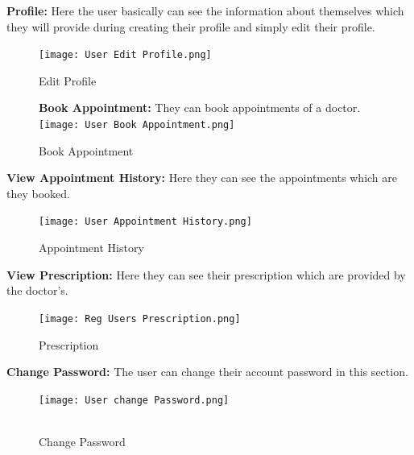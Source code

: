 \documentclass[14pt,a4paper,calibribody]{article}
\begin{document}
\textbf{Profile:} Here the user basically can see the information about themselves which they will provide during creating their profile and simply edit their profile.
\begin{figure}[h]
\texttt{[image: User Edit Profile.png]}
\caption{Edit Profile}
\end{figure}
\clearpage
\begin{figure}[h]
\textbf{Book Appointment:} They can book appointments of a doctor. \\
\texttt{[image: User Book Appointment.png]}\\
\caption{Book Appointment}
\end{figure}

\textbf{View Appointment History:} Here they can see the appointments which are they booked.\\
\begin{figure}[h]
\texttt{[image: User Appointment History.png]}\\
\caption{Appointment History}
\end{figure}
\clearpage
\textbf{View Prescription:} Here they can see their prescription which are provided by the doctor's.\\
\begin{figure}[h]
\texttt{[image: Reg Users Prescription.png]}\\
\caption{Prescription}
\end{figure}

\textbf{Change Password:} The user can change their account password in this section.\\
\begin{figure}[h]
\texttt{[image: User change Password.png]}\\\\
\caption{Change Password}
\end{figure}
\clearpage
\end{document}
